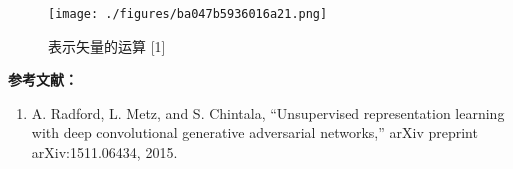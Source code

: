 \begin{figure}[ht]
\centering
\texttt{[image: ./figures/ba047b5936016a21.png]}
\caption{表示矢量的运算 [1]} \label{fig_DCGAN_3}
\end{figure}




\textbf{参考文献：}
\begin{enumerate}
\item A. Radford, L. Metz, and S. Chintala, “Unsupervised representation learning with deep convolutional generative adversarial networks,” arXiv preprint arXiv:1511.06434, 2015.
\end{enumerate}
